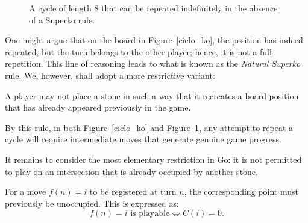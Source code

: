 \begin{figure}[H]
	\caption{A cycle of length 8 that can be repeated indefinitely in the absence of a Superko rule.}
	\label{ciclo_inf}
\end{figure}
One might argue that on the board in Figure~\ref{ciclo_ko}, the position has indeed repeated, but the turn belongs to the other player; hence, it is not a full repetition. This line of reasoning leads to what is known as the \textit{Natural Superko} rule. We, however, shall adopt a more restrictive variant:
\begin{definition}\label{sec-superko}
	A player may not place a stone in such a way that it recreates a board position that has already appeared previously in the game.
\end{definition}
By this rule, in both Figure~\ref{ciclo_ko} and Figure~\ref{ciclo_inf}, any attempt to repeat a cycle will require intermediate moves that generate genuine game progress.

It remains to consider the most elementary restriction in Go: it is not permitted to play on an intersection that is already occupied by another stone.

\begin{definition}
	For a move \(f(n) = i\) to be registered at turn \(n\), the corresponding point must previously be unoccupied. This is expressed as:
	$$f(n) = i \text{ is playable} \iff C(i) = 0.$$
	\end{definition}

